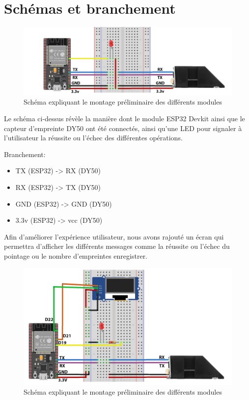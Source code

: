 \section{Schémas et branchement}

 \begin{figure}[h!]
    \centering
    \includegraphics[scale=0.2]{images/schema/montage_illustration.png}
    \caption{Schéma expliquant le montage préliminaire des différents modules  }
    \label{fig52}
\end{figure}

Le schéma ci-dessus révèle la manière dont le module ESP32 Devkit ainsi que le 
capteur d’empreinte DY50 ont été connectés, ainsi qu’une LED pour signaler à 
l’utilisateur la réussite ou l’échec des différentes opérations.

\clearpage  
Branchement: 

\begin{itemize}
    \item [\textbullet]TX (ESP32) -> RX (DY50)
    \item [\textbullet]RX (ESP32) -> TX (DY50)
    \item [\textbullet]GND (ESP32) -> GND (DY50) 
    \item [\textbullet]3.3v (ESP32) -> vcc (DY50)    
\end{itemize}            

Afin d’améliorer l’expérience utilisateur, nous avons rajouté un écran qui 
permettra d’afficher les différents messages comme la réussite ou l’échec 
du pointage ou le nombre d’empreintes enregistrer.

\begin{figure}[h!]
    \centering
    \includegraphics[scale=0.2]{images/schema/schemat v3 sans uvc.png}
    \caption{Schéma expliquant le montage préliminaire des différents modules}
    \label{fig53}
\end{figure}

